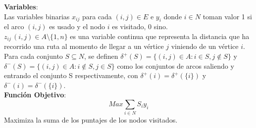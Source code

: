 \noindent
\textbf{Variables}:\\
\indent Las variables binarias $x_{ij}$ para cada $(i,j) \in E$ e $y_{i}$ donde $i\in N$ toman valor 1 si el arco $(i,j)$ es usado y el nodo $i$ es visitado, 0 sino.\\
$z_{ij}\, (i,j)\in A\setminus \{1,n\}$ es una variable continua que representa la distancia que ha recorrido una ruta al momento de llegar a un v\'ertice $j$ viniendo de un v\'ertice $i$.\\
Para cada conjunto $S\subseteq N$, se definen $\delta^{+}(S) = \{(i,j) \in A:i\in S, j\notin S\}$ y $\delta^{-}(S) = \{(i,j) \in A:i\notin S, j\in S\}$  como los conjuntos de arcos saliendo y entrando el conjunto S respectivamente, con $\delta^{+}(i) = \delta^{+}(\{i\})$ y $\delta^{-}(i) = \delta^{-}(\{i\})$.\\

\noindent
\textbf{Funci\'on Objetivo}:\\
\begin{equation}\label{eq2:fx}
    Max \sum_{i\in N}S_{i}y_{i}
\end{equation}
Maximiza la suma de los puntajes de los nodos visitados.\\

